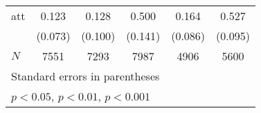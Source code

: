{\begin{tabular}{l*{5}{c}}
att         &       0.123         &       0.128         &       0.500\sym{***}&       0.164         &       0.527\sym{***}\\
            &     (0.073)         &     (0.100)         &     (0.141)         &     (0.086)         &     (0.095)         \\
\hline
\(N\)       &        7551         &        7293         &        7987         &        4906         &        5600         \\
\hline\hline
\multicolumn{6}{l}{\footnotesize Standard errors in parentheses}\\
\multicolumn{6}{l}{\footnotesize \sym{*} \(p<0.05\), \sym{**} \(p<0.01\), \sym{***} \(p<0.001\)}\\
\end{tabular}
}
